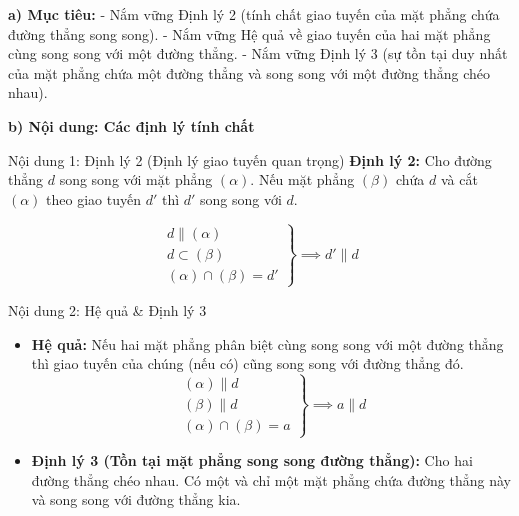 \documentclass[12pt, a4paper]{article}
\begin{document}
\noindent \textbf{a) Mục tiêu:}
- Nắm vững Định lý 2 (tính chất giao tuyến của mặt phẳng chứa đường thẳng song song).
- Nắm vững Hệ quả về giao tuyến của hai mặt phẳng cùng song song với một đường thẳng.
- Nắm vững Định lý 3 (sự tồn tại duy nhất của mặt phẳng chứa một đường thẳng và song song với một đường thẳng chéo nhau).

\noindent \textbf{b) Nội dung: Các định lý tính chất}
\begin{pedabox}{Nội dung 1: Định lý 2 (Định lý giao tuyến quan trọng)}
\textbf{Định lý 2:} Cho đường thẳng $d$ song song với mặt phẳng $(\alpha)$. Nếu mặt phẳng $(\beta)$ chứa $d$ và cắt $(\alpha)$ theo giao tuyến $d'$ thì $d'$ song song với $d$.
\begin{center}
\end{center}
$$\left.\begin{array}{l} d \parallel (\alpha) \\ d \subset (\beta) \\ (\alpha) \cap (\beta) = d' \end{array}\right\} \implies d' \parallel d$$
\end{pedabox}

\begin{pedabox}{Nội dung 2: Hệ quả & Định lý 3}
\begin{itemize}[leftmargin=0.6cm]
    \item \textbf{Hệ quả:} Nếu hai mặt phẳng phân biệt cùng song song với một đường thẳng thì giao tuyến của chúng (nếu có) cũng song song với đường thẳng đó.
    $$\left.\begin{array}{l} (\alpha) \parallel d \\ (\beta) \parallel d \\ (\alpha) \cap (\beta) = a \end{array}\right\} \implies a \parallel d$$
    \item \textbf{Định lý 3 (Tồn tại mặt phẳng song song đường thẳng):} Cho hai đường thẳng chéo nhau. Có một và chỉ một mặt phẳng chứa đường thẳng này và song song với đường thẳng kia.
\end{itemize}
\end{pedabox}
\end{document}
